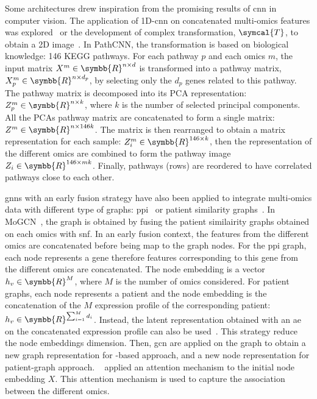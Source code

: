 \documentclass[../main.tex]{subfiles}
\begin{document}
		Some architectures drew inspiration from the promising results of \gls{cnn} in computer vision. 
		The application of 1D-\gls{cnn} on concatenated multi-omics features was explored~\cite{CNN1D} or the development of complex transformation, \(\symcal{T}\), to obtain a 2D image~\cite{PathCNN}. 
		In PathCNN, the transformation is based on biological knowledge: 146 KEGG pathways. 
		For each pathway \(p\) and each omics \(m\), the input matrix \(X^{m} \in \symbb{R}^{n \times d}\) is transformed into a pathway matrix, \(X_{p}^{m} \in \symbb{R}^{n \times d_{p}}\), by selecting only the \(d_{p}\) genes related to this pathway. 
		The pathway matrix is decomposed into its PCA representation: \(Z_{p}^{m} \in \symbb{R}^{n \times k}\), where \(k\) is the number of selected principal components. 
		All the PCAs pathway matrix are concatenated to form a single matrix: \(Z^{m} \in \symbb{R}^{n \times 146k}\). 
		The matrix is then rearranged to obtain a matrix representation for each sample: \(Z_{i}^{m} \in \symbb{R}^{146 \times k}\), then the representation of the different omics are combined to form the pathway image \(Z_{i} \in \symbb{R}^{146 \times mk}\). 
		Finally, pathways (\ie{}rows) are reordered to have correlated pathways close to each other. 

		\Glspl{gnn} with an early fusion strategy have also been applied to integrate multi-omics data with different type of graphs: \gls{ppi}~\cite{Guo2023} or patient similarity graphs~\cite{MoGCN}. 
		In MoGCN~\cite{MoGCN}, the graph is obtained by fusing the patient similairity graphs obtained on each omics with \gls{snf}. 
		In an early fusion context, the features from the different omics are concatenated before being map to the graph nodes. 
		For the \gls{ppi} graph, each node represents a gene therefore features corresponding to this gene from the different omics are concatenated. 
		The node embedding is a vector \(h_{v} \in \symbb{R}^{M}\), where \(M\) is the number of omics considered. 
		For patient graphs, each node represents a patient and the node embedding is the concatenation of the \(M\) expression profile of the corresponding patient: \(h_{v} \in \symbb{R}^{\sum_{i=1}^{M}d_i}\). 
		Instead, the latent representation obtained with an \gls{ae} on the concatenated expression profile can also be used~\cite{MoGCN}. 
		This strategy reduce the node embeddings dimension. 
		Then, \gls{gcn} are applied on the graph to obtain a new graph representation for -based approach, and a new node representation for patient-graph approach. 
		\citeauthor{Guo2023}~\cite{Guo2023} applied an attention mechanism to the initial node embedding \(X\). 
		This attention mechanism is used to capture the association between the different omics. 
		
\end{document}

